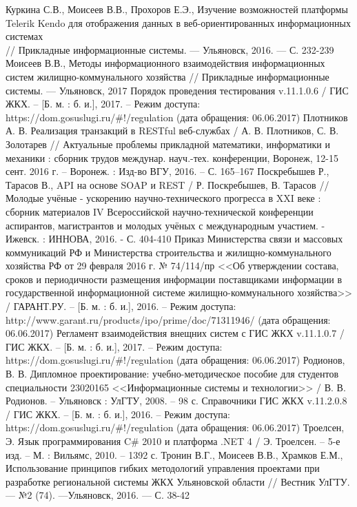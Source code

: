 \begin{thebibliography}{99}
	 Куркина С.В., Моисеев В.В., Прохоров Е.Э., Изучение возможностей платформы Telerik Kendo для отображения данных в веб-ориентированных информационных системах \\ // Прикладные информационные системы. — Ульяновск, 2016. — С. 232-239
	 Моисеев В.В., Методы информационного взаимодействия информационных систем жилищно-коммунального хозяйства // Прикладные информационные системы. — Ульяновск, 2017
	 Порядок проведения тестирования v.11.1.0.6 / ГИС ЖКХ. – [Б. м. : б. и.], 2017. – Режим доступа: https://dom.gosuslugi.ru/\#!/regulation (дата обращения: 06.06.2017)
	 Плотников А. В. Реализация транзакций в RESTful веб-службах / А. В. Плотников, С. В. Золотарев // Актуальные проблемы прикладной математики, информатики и механики : сборник трудов междунар. науч.-тех. конференции, Воронеж, 12-15 сент. 2016 г. – Воронеж. : Изд-во ВГУ, 2016. – С. 165–167
	 Поскребышев Р., Тарасов В., API на основе SOAP и REST / Р. Поскребышев, В. Тарасов // Молодые учёные - ускорению научно-технического прогресса в XXI веке : сборник материалов IV Всероссийской научно-технической конференции аспирантов, магистрантов и молодых учёных с международным участием. - Ижевск. : ИННОВА, 2016. - С. 404-410
	 Приказ Министерства связи и массовых коммуникаций РФ и Министерства строительства и жилищно-коммунального хозяйства РФ от 29 февраля 2016 г. № 74/114/пр <<Об утверждении состава, сроков и периодичности размещения информации поставщиками информации в государственной информационной системе жилищно-коммунального хозяйства>> / ГАРАНТ.РУ. – [Б. м. : б. и.], 2016. – Режим доступа: http://www.garant.ru/products/ipo/prime/doc/71311946/ (дата обращения: 06.06.2017)
	 Регламент взаимодействия внещних систем с ГИС ЖКХ v.11.1.0.7 / ГИС ЖКХ. – [Б. м. : б. и.], 2017. – Режим доступа: https://dom.gosuslugi.ru/\#!/regulation (дата обращения: 06.06.2017)
	 Родионов, В. В. Дипломное проектирование: учебно-методическое пособие для студентов специальности 23020165 <<Информационные системы и технологии>> / В. В. Родионов. – Ульяновск : УлГТУ, 2008. – 98 с.
	 Справочники ГИС ЖКХ v.11.2.0.8 / ГИС ЖКХ. – [Б. м. : б. и.], 2016. – Режим доступа: https://dom.gosuslugi.ru/\#!/regulation (дата обращения: 06.06.2017)
	 Троелсен, Э. Язык программирования C\# 2010 и платформа .NET 4 / Э. Троелсен. – 5-е изд. – М. : Вильямс, 2010. – 1392 с.
	 Тронин В.Г., Моисеев В.В., Храмков Е.М., Использование принципов гибких методологий управления проектами при разработке региональной системы ЖКХ Ульяновской области // Вестник УлГТУ. — №2 (74). —Ульяновск, 2016. — С. 38-42

\end{thebibliography}
